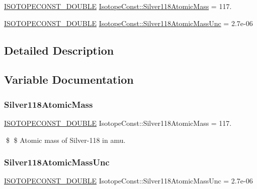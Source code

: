 \begin{DoxyCompactItemize}
\item 
\mbox{\hyperlink{group___isotope_const-_macros_ga8f45a7272ce02c0b4c65c44636ed719a}{I\+S\+O\+T\+O\+P\+E\+C\+O\+N\+S\+T\+\_\+\+D\+O\+U\+B\+LE}} \mbox{\hyperlink{group___isotope_const-_silver-_ag118_ga65bcceef57fb9da67a48109c0623114b}{Isotope\+Const\+::\+Silver118\+Atomic\+Mass}} = 117.
\item 
\mbox{\hyperlink{group___isotope_const-_macros_ga8f45a7272ce02c0b4c65c44636ed719a}{I\+S\+O\+T\+O\+P\+E\+C\+O\+N\+S\+T\+\_\+\+D\+O\+U\+B\+LE}} \mbox{\hyperlink{group___isotope_const-_silver-_ag118_ga1927312df46b96e237b7f0a611954bfb}{Isotope\+Const\+::\+Silver118\+Atomic\+Mass\+Unc}} = 2.\+7e-\/06
\end{DoxyCompactItemize}


\subsection{Detailed Description}


\subsection{Variable Documentation}
\mbox{\label{group___isotope_const-_silver-_ag118_ga65bcceef57fb9da67a48109c0623114b}} 
\subsubsection{\texorpdfstring{Silver118\+Atomic\+Mass}{Silver118AtomicMass}}
{\footnotesize\ttfamily \mbox{\hyperlink{group___isotope_const-_macros_ga8f45a7272ce02c0b4c65c44636ed719a}{I\+S\+O\+T\+O\+P\+E\+C\+O\+N\+S\+T\+\_\+\+D\+O\+U\+B\+LE}} Isotope\+Const\+::\+Silver118\+Atomic\+Mass = 117.}

\$ \$ Atomic mass of Silver-\/118 in amu. \mbox{\label{group___isotope_const-_silver-_ag118_ga1927312df46b96e237b7f0a611954bfb}} 
\subsubsection{\texorpdfstring{Silver118\+Atomic\+Mass\+Unc}{Silver118AtomicMassUnc}}
{\footnotesize\ttfamily \mbox{\hyperlink{group___isotope_const-_macros_ga8f45a7272ce02c0b4c65c44636ed719a}{I\+S\+O\+T\+O\+P\+E\+C\+O\+N\+S\+T\+\_\+\+D\+O\+U\+B\+LE}} Isotope\+Const\+::\+Silver118\+Atomic\+Mass\+Unc = 2.\+7e-\/06}

